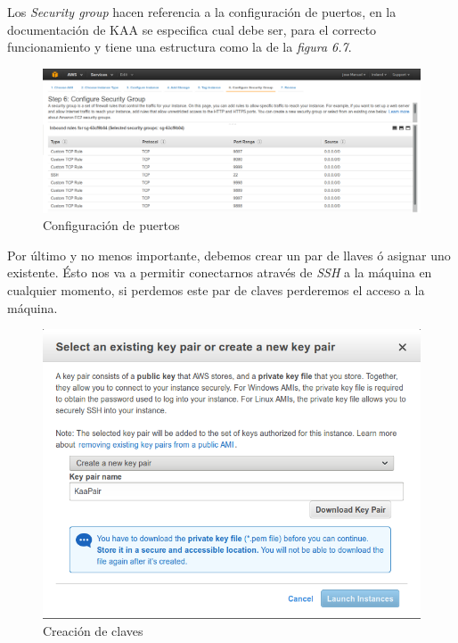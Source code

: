 Los \textit{Security group} hacen referencia a la configuración de puertos, en la documentación de KAA se especifica cual debe ser, para el correcto funcionamiento y tiene una estructura como la de la \textit{ figura 6.7}.

\begin{figure}[!ht]
  \begin{center}
    \includegraphics[scale=0.30]{../images/kaa/6.png}
		\caption{Configuración de puertos}
    \label{fig:kaa}
	\end{center}
\end{figure}

\newpage

Por último y no menos importante, debemos crear un par de llaves ó asignar uno existente. Ésto nos va a permitir conectarnos através de \textit{SSH} a la máquina en cualquier momento, si perdemos este par de claves perderemos el acceso a la máquina.

\begin{figure}[!ht]
  \begin{center}
    \includegraphics[scale=0.45]{../images/kaa/7.png}
		\caption{Creación de claves}
    \label{fig:kaa}
	\end{center}
\end{figure}

